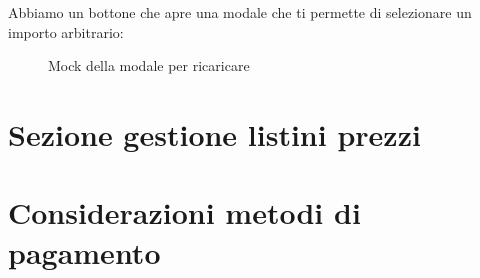 Abbiamo un bottone che apre una modale che ti permette di selezionare un importo arbitrario:

\begin{figure}[H]
  \centering
  \caption{Mock della modale per ricaricare}
\end{figure}

\section{Sezione gestione listini prezzi}

\section{Considerazioni metodi di pagamento}
